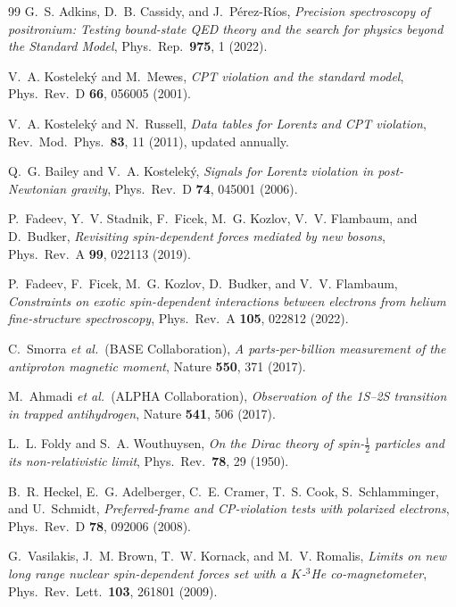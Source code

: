 \documentclass[12pt,a4paper]{report}
\begin{document}
\begin{thebibliography}{99}
G.~S. Adkins, D.~B. Cassidy, and J.~P\'{e}rez-R\'{i}os,
\textit{Precision spectroscopy of positronium: Testing bound-state QED
theory and the search for physics beyond the Standard Model},
Phys.\ Rep.\ \textbf{975}, 1 (2022).

V.~A. Kostelek\'{y} and M.~Mewes,
\textit{CPT violation and the standard model},
Phys.\ Rev.\ D \textbf{66}, 056005 (2001).

V.~A. Kostelek\'{y} and N.~Russell,
\textit{Data tables for Lorentz and CPT violation},
Rev.\ Mod.\ Phys.\ \textbf{83}, 11 (2011), updated annually.

Q.~G. Bailey and V.~A. Kostelek\'{y},
\textit{Signals for Lorentz violation in post-Newtonian gravity},
Phys.\ Rev.\ D \textbf{74}, 045001 (2006).

P.~Fadeev, Y.~V. Stadnik, F.~Ficek, M.~G. Kozlov, V.~V. Flambaum, and
D.~Budker,
\textit{Revisiting spin-dependent forces mediated by new bosons},
Phys.\ Rev.\ A \textbf{99}, 022113 (2019).

P.~Fadeev, F.~Ficek, M.~G. Kozlov, D.~Budker, and V.~V. Flambaum,
\textit{Constraints on exotic spin-dependent interactions between electrons from
helium fine-structure spectroscopy},
Phys.\ Rev.\ A \textbf{105}, 022812 (2022).

C.~Smorra \textit{et al.}\ (BASE Collaboration),
\textit{A parts-per-billion measurement of the antiproton magnetic moment},
Nature \textbf{550}, 371 (2017).

M.~Ahmadi \textit{et al.}\ (ALPHA Collaboration),
\textit{Observation of the 1S--2S transition in trapped antihydrogen},
Nature \textbf{541}, 506 (2017).

L.~L. Foldy and S.~A. Wouthuysen,
\textit{On the Dirac theory of spin-$\frac{1}{2}$ particles and its
non-relativistic limit},
Phys.\ Rev.\ \textbf{78}, 29 (1950).

B.~R. Heckel, E.~G. Adelberger, C.~E. Cramer, T.~S. Cook, S.~Schlamminger,
and U.~Schmidt,
\textit{Preferred-frame and CP-violation tests with polarized electrons},
Phys.\ Rev.\ D \textbf{78}, 092006 (2008).

G.~Vasilakis, J.~M. Brown, T.~W. Kornack, and M.~V. Romalis,
\textit{Limits on new long range nuclear spin-dependent forces set with a
$K$-$^{3}$He co-magnetometer},
Phys.\ Rev.\ Lett.\ \textbf{103}, 261801 (2009).


\end{thebibliography}
\end{document}
